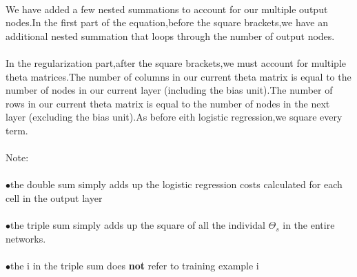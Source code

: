 \documentclass[UTF8]{ctexart}
\begin{document}
\paragraph{}
We have added a few nested summations to account for our multiple output nodes.In the first part of the equation,before the square brackets,we have an additional nested summation that loops through the number of output nodes.
\paragraph{}
In the regularization part,after the square brackets,we must account for multiple theta matrices.The number of columns in our current theta matrix is equal to the number of nodes in our current layer (including the bias unit).The number of rows in our current theta matrix is equal to the number of nodes in the next layer (excluding the bias unit).As before eith logistic regression,we square every term.
\paragraph{}
Note:
\paragraph{}
$\bullet$\quad the double sum simply adds up the logistic regression costs calculated for each cell in the output layer
\paragraph{}
$\bullet$\quad the triple sum simply adds up the square of all the individal $\Theta_{s}$ in the entire networks.
\paragraph{}
$\bullet$\quad the i in the triple sum does \textbf{not} refer to training example i
\newpage
\section{}
\end{document}
